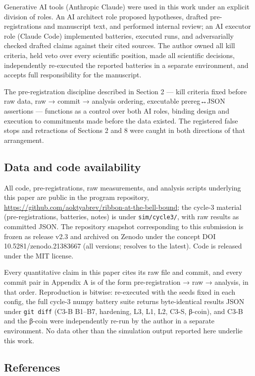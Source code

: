 \documentclass[
  11pt]{article}
\begin{document}
Generative AI tools (Anthropic Claude) were used in this work under an
explicit division of roles. An AI architect role proposed hypotheses,
drafted pre-registrations and manuscript text, and performed internal
review; an AI executor role (Claude Code) implemented batteries, executed
runs, and adversarially checked drafted claims against their cited sources.
The author owned all kill criteria, held veto over every scientific
position, made all scientific decisions, independently re-executed the
reported batteries in a separate environment, and accepts full
responsibility for the manuscript.

The pre-registration discipline described in Section 2 --- kill criteria
fixed before raw data, raw → commit → analysis ordering, executable
prereg↔JSON assertions --- functions as a control over both AI roles,
binding design and execution to commitments made before the data existed.
The registered false stops and retractions of Sections 2 and 8 were caught
in both directions of that arrangement.

\subsection{Data and code
availability}\label{data-and-code-availability}

All code, pre-registrations, raw measurements, and analysis scripts
underlying this paper are public in the program repository,
\url{https://github.com/aoktyabrev/ribbon-at-the-bell-bound}; the
cycle-3 material (pre-registrations, batteries, notes) is under
\texttt{sim/cycle3/}, with raw results as committed JSON. The repository
snapshot corresponding to this submission is frozen as release v2.3 and
archived on Zenodo under the concept DOI 10.5281/zenodo.21383667 (all
versions; resolves to the latest). Code is released under the MIT
license.

Every quantitative claim in this paper cites its raw file and commit,
and every commit pair in Appendix A is of the form pre-registration →
raw → analysis, in that order. Reproduction is bitwise: re-executed with
the seeds fixed in each config, the full cycle-3 numpy battery suite
returns byte-identical results JSON under \texttt{git\ diff} (C3-B
B1--B7, hardening, L3, L1, L2, C3-S, β-coin), and C3-B and the β-coin
were independently re-run by the author in a separate environment. No
data other than the simulation output reported here underlie this work.

\subsection{References}\label{references}
\end{document}
